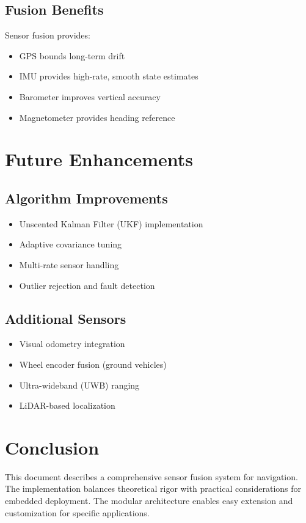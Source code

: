 \documentclass[12pt,a4paper]{article}
\begin{document}
\subsection{Fusion Benefits}

Sensor fusion provides:
\begin{itemize}
    \item GPS bounds long-term drift
    \item IMU provides high-rate, smooth state estimates
    \item Barometer improves vertical accuracy
    \item Magnetometer provides heading reference
\end{itemize}

\section{Future Enhancements}

\subsection{Algorithm Improvements}

\begin{itemize}
    \item Unscented Kalman Filter (UKF) implementation \cite{wan2000unscented}
    \item Adaptive covariance tuning
    \item Multi-rate sensor handling
    \item Outlier rejection and fault detection
\end{itemize}

\subsection{Additional Sensors}

\begin{itemize}
    \item Visual odometry integration
    \item Wheel encoder fusion (ground vehicles)
    \item Ultra-wideband (UWB) ranging
    \item LiDAR-based localization
\end{itemize}

\section{Conclusion}

This document describes a comprehensive sensor fusion system for navigation. The implementation balances theoretical rigor with practical considerations for embedded deployment. The modular architecture enables easy extension and customization for specific applications.



\end{document}
